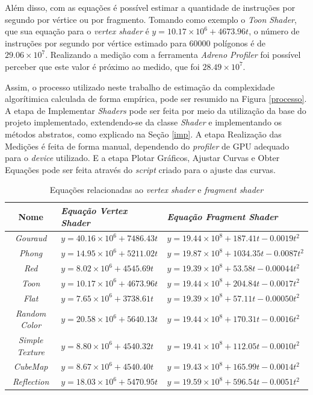 	Além disso, com as equações é possível estimar a quantidade de instruções por segundo por vértice ou por fragmento. Tomando como exemplo o \textit{Toon Shader}, que sua equação para o \textit{vertex shader} é  $y = 10.17 \times 10^6 + 4673.96t$, o número de instruções por segundo por vértice estimado para 60000 polígonos é de $29.06 \times 10^7$. Realizando a medição com a ferramenta \textit{Adreno Profiler} foi possível perceber que este valor é próximo ao medido, que foi $28.49 \times 10^7$.
	
	Assim, o processo utilizado neste trabalho de estimação da complexidade algorítimica calculada de forma empírica, pode ser resumido na Figura \ref{processo}. A etapa de Implementar \textit{Shaders} pode ser feita por meio da utilização da base do projeto implementado, extendendo-se da classe \textit{Shader} e implementando os métodos abstratos, como explicado na Seção \ref{imp}. A etapa Realização das Medições é feita de forma manual, dependendo do \textit{profiler} de GPU adequado para o \textit{device} utilizado. E a etapa Plotar Gráficos, Ajustar Curvas e Obter Equações pode ser feita através do \textit{script} criado para o ajuste das curvas.

	\begin{table}[ht]
	\centering	
	\begin{tabularx}{0.9\textwidth}{cXX}
		\toprule
		\textbf{Nome} & \textbf{\textit{Equação Vertex Shader}} & \textbf{\textit{Equação Fragment Shader}}  \\
		\midrule
		\textit{Gouraud} & $y = 40.16 \times 10^6 + 7486.43t$ & $y = 19.44 \times 10 ^8 + 187.41t - 0.0019t^2$ \\
		\textit{Phong} &  $y = 14.95 \times 10^6 + 5211.02t$ & $y = 19.87 \times 10^8 + 1034.35t - 0.0087t^2$\\
		\textit{Red} & $y = 8.02 \times 10^6 + 4545.69t$ & $y = 19.39 \times 10 ^8 + 53.58t - 0.00044t^2$ \\
		\textit{Toon} & $y = 10.17 \times 10^6 + 4673.96t$ & $y = 19.44 \times 10 ^8 + 204.84t - 0.0017t^2$ \\
		\textit{Flat} & $y = 7.65 \times 10^6 + 3738.61t$ & $y = 19.39 \times 10 ^8 + 57.11t - 0.00050t^2$ \\
		\textit{Random Color} & $y = 20.58 \times 10^6 + 5640.13t$ & $y = 19.44 \times 10 ^8 + 170.31t - 0.0016t^2$ \\
		\textit{Simple Texture} & $y = 8.80 \times 10^6 + 4540.32t$ & $y = 19.41 \times 10 ^8 + 112.05t - 0.0010t^2$ \\
		\textit{CubeMap} & $y = 8.67 \times 10^6 + 4540.40t$ & $y = 19.43 \times 10 ^8 + 165.99t - 0.0014t^2$ \\
		\textit{Reflection} & $y = 18.03 \times 10^6 + 5470.95t$ & $y = 19.59 \times 10 ^8 + 596.54t - 0.0051t^2$ \\
	
		\bottomrule
	\end{tabularx}
	\caption{Equações relacionadas ao \textit{vertex shader} e \textit{fragment shader}}
	\label{equacoes}
	\end{table}

